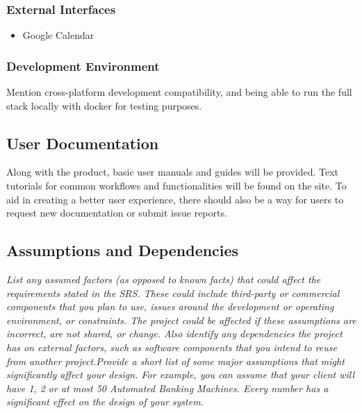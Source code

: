         \subsubsection{External Interfaces}
            \begin{itemize}
                \item Google Calendar
            \end{itemize}
        \subsubsection{Development Environment}
            \todo Mention cross-platform development compatibility, and being able to run the full stack locally with \gls{docker} for testing purposes.
    \subsection{User Documentation}\label{sec:user-documentation}
        Along with the product, basic user manuals and guides will be provided. Text tutorials for common workflows and functionalities will be found on the site. To aid in creating a better user experience, there should also be a way for users to request new documentation or submit issue reports.
    \subsection{Assumptions and Dependencies}\label{sec:assumptions-dependencies}
        \emph{List any assumed factors (as opposed to known facts) that could affect the requirements stated in the SRS. These could include third-party or commercial components that you plan to use, issues around the development or operating environment, or constraints. The project could be affected if these assumptions are incorrect, are not shared, or change. Also identify any dependencies the project has on external factors, such as software components that you intend to reuse from another project.\gnl Provide a short list of some major assumptions that might significantly affect your design. For example, you can assume that your client will have 1, 2 or at most 50 Automated Banking Machines. Every number has a significant effect on the design of your system.}
